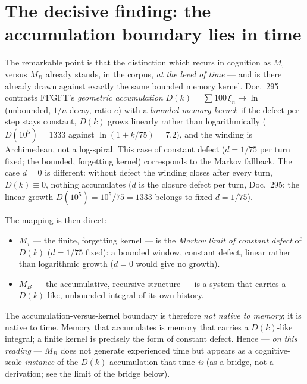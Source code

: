 \section{The decisive finding: the accumulation boundary lies in time}

The remarkable point is that the distinction which recurs in cognition as $M_\tau$ versus
$M_B$ already stands, in the corpus, \emph{at the level of time} --- and is there already
drawn against exactly the same bounded memory kernel. Doc.~295 contrasts FFGFT's
\emph{geometric accumulation} $D(k)=\sum 100\,\xi_n\to\ln$ (unbounded, $1/n$ decay, ratio
$e$) with a \emph{bounded memory kernel}: if the defect per step stays constant, $D(k)$
grows linearly rather than logarithmically ($D(10^5)=1333$ against $\ln(1+k/75)=7.2$), and
the winding is Archimedean, not a log-spiral. This case of constant defect ($d = 1/75$
per turn fixed; the bounded, forgetting kernel) corresponds to the Markov fallback. The
case $d=0$ is different: without defect the winding closes after every turn,
$D(k)\equiv 0$, nothing accumulates ($d$ is the closure defect per turn, Doc.~295;
the linear growth $D(10^5) = 10^5/75 = 1333$ belongs to fixed $d = 1/75$).

The mapping is then direct:
\begin{itemize}
\item $M_\tau$ --- the finite, forgetting kernel --- is the \emph{Markov limit of constant
defect} of $D(k)$ ($d = 1/75$ fixed): a bounded window, constant defect, linear rather than
logarithmic growth ($d = 0$ would give no growth).
\item $M_B$ --- the accumulative, recursive structure --- is a system that carries a
$D(k)$-like, unbounded integral of its own history.
\end{itemize}

The accumulation-versus-kernel boundary is therefore \emph{not native to memory}; it is
native to time. Memory that accumulates is memory that carries a $D(k)$-like integral; a
finite kernel is precisely the form of constant defect. Hence --- \emph{on this reading} --- $M_B$ does not generate
experienced time but appears as a cognitive-scale \emph{instance} of the $D(k)$ accumulation
that time \emph{is} (as a bridge, not a derivation; see the limit of the bridge below).

